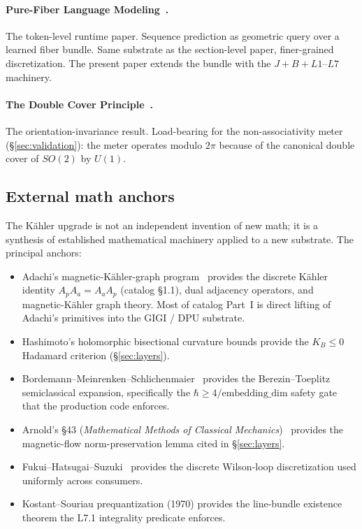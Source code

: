 \documentclass[11pt,letterpaper]{article}
\begin{document}
\paragraph{Pure-Fiber Language Modeling~\cite{davis2026purefiber}.}
The token-level runtime paper. Sequence prediction as geometric query
over a learned fiber bundle. Same substrate as the section-level
paper, finer-grained discretization. The present paper extends the
bundle with the $J + B + L1\text{--}L7$ machinery.

\paragraph{The Double Cover Principle~\cite{davis2026doublecover}.}
The orientation-invariance result. Load-bearing for the
non-associativity meter (\S\ref{sec:validation}): the meter operates
modulo $2\pi$ because of the canonical double cover of $SO(2)$ by
$U(1)$.

\subsection{External math anchors}

The K\"ahler upgrade is not an independent invention of new math; it
is a synthesis of established mathematical machinery applied to a new
substrate. The principal anchors:

\begin{itemize}[nosep]
\item Adachi's magnetic-K\"ahler-graph
  program~\cite{adachi2010hopfrinow} provides the discrete K\"ahler
  identity $A_p A_a = A_a A_p$ (catalog \S1.1), dual adjacency
  operators, and magnetic-K\"ahler graph theory. Most of catalog
  Part~I is direct lifting of Adachi's primitives into the GIGI / DPU
  substrate.
\item Hashimoto's holomorphic bisectional curvature bounds provide
  the $K_B \leq 0$ Hadamard criterion (\S\ref{sec:layers}).
\item Bordemann--Meinrenken--Schlichenmaier~\cite{bordemann1994toeplitz}
  provides the Berezin--Toeplitz semiclassical expansion,
  specifically the $\hbar \geq 4/\text{embedding\_dim}$ safety gate
  that the production code enforces.
\item Arnold's \S43 (\emph{Mathematical Methods of Classical
  Mechanics})~\cite{arnold1989mechanics} provides the magnetic-flow
  norm-preservation lemma cited in \S\ref{sec:layers}.
\item Fukui--Hatsugai--Suzuki~\cite{fhs2005chern} provides the
  discrete Wilson-loop discretization used uniformly across
  consumers.
\item Kostant--Souriau prequantization (1970) provides the
  line-bundle existence theorem the L7.1 integrality predicate
  enforces.
\end{itemize}
\end{document}
